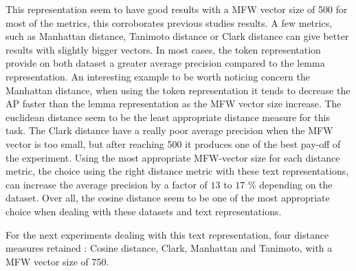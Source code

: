 This representation seem to have good results with a MFW vector size of 500 for most of the metrics, this corroborates previous studies results.
A few metrics, such as Manhattan distance, Tanimoto distance or Clark distance can give better results with slightly bigger vectors.
In most cases, the token representation provide on both dataset a greater average precision compared to the lemma representation.
An interesting example to be worth noticing concern the Manhattan distance, when using the token representation it tends to decrease the AP faster than the lemma representation as the MFW vector size increase.
The euclidean distance seem to be the least appropriate distance measure for this task.
The Clark distance have a really poor average precision when the MFW vector is too small, but after reaching 500 it produces one of the best pay-off of the experiment.
Using the most appropriate MFW-vector size for each distance metric, the choice using the right distance metric with these text representations, can increase the average precision by a factor of $13$ to $17$ \% depending on the dataset.
Over all, the cosine distance seem to be one of the most appropriate choice when dealing with these datasets and text representations.

For the next experiments dealing with this text representation, four distance measures retained : Cosine distance, Clark, Manhattan and Tanimoto, with a MFW vector size of 750.


